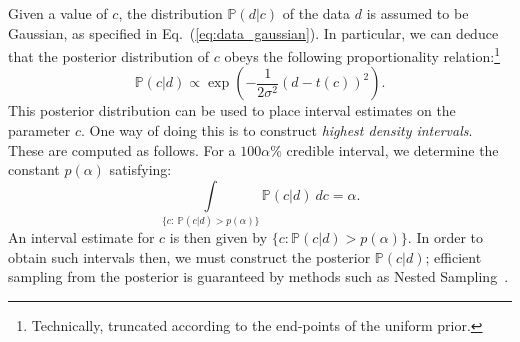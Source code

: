 \documentclass[withindex,glossary]{cam-thesis}
\begin{document}
Given a value of $c$, the distribution $\mathbb{P}(d|c)$ of the data $d$ is assumed to be Gaussian, as specified in Eq.~(\ref{eq:data_gaussian}). In particular, we can deduce that the posterior distribution of $c$ obeys the following proportionality relation:\footnote{Technically, truncated according to the end-points of the uniform prior.}
\begin{equation}
\label{eq:bayesian_posterior}
\mathbb{P}(c|d) \propto \exp\left( -\frac{1}{2\sigma^2} \left( d - t(c) \right)^2 \right).
\end{equation}
\noindent This posterior distribution can be used to place interval estimates on the parameter $c$. One way of doing this is to construct \textit{highest density intervals}. These are computed as follows.
%
For a $100\alpha$\% credible interval, we determine the constant $p(\alpha)$ satisfying:
\begin{equation}
\int\limits_{\{c : ~\mathbb{P}(c|d) > p(\alpha)\}} \mathbb{P}(c|d)\ dc = \alpha.
\end{equation}
\noindent An interval estimate for $c$ is then given by $\{c : \mathbb{P}(c|d) > p(\alpha)\}$. In order to obtain such intervals then, we must construct the posterior $\mathbb{P}(c|d)$; efficient sampling from the posterior
is guaranteed by methods such as Nested Sampling~\cite{Feroz:2013hea,Feroz:2007kg}.
\end{document}
